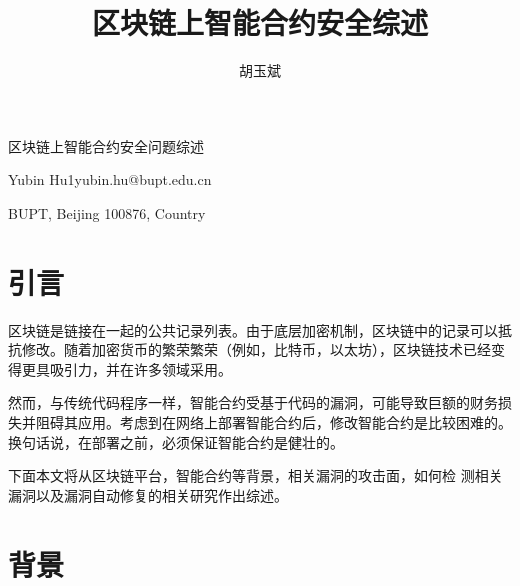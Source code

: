\documentclass{SCIS2022cn}
\begin{document}
\DOI{}


\title{区块链上智能合约安全综述}{区块链上智能合约安全问题综述}


\author[1]{胡玉斌}{Yubin Hu1}{yubin.hu@bupt.edu.cn}

\address[1]{北京邮电大学, 网络空间安全, 北京 100876}{BUPT, Beijing {\rm 100876}, Country}



\maketitle

\section{引言}

区块链是链接在一起的公共记录列表。由于底层加密机制，区块链中的记录可以抵抗修改。随着加密货币的繁荣繁荣（例如，比特币，以太坊），区块链技术已经变得更具吸引力，并在许多领域采用。

然而，与传统代码程序一样，智能合约受基于代码的漏洞，可能导致巨额的财务损失并阻碍其应用。考虑到在网络上部署智能合约后，修改智能合约是比较困难的。换句话说，在部署之前，必须保证智能合约是健壮的。

下面本文将从区块链平台，智能合约等背景，相关漏洞的攻击面，如何检 测相关漏洞以及漏洞自动修复的相关研究作出综述。

\section{背景}
\end{document}
